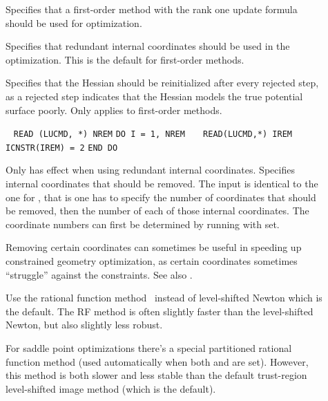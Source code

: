 \begin{description}

\item[]
Specifies that a first-order method
with the rank
one update formula should be used for optimization.

\item[]
Specifies that redundant internal coordinates should be used in the
optimization. This is the default for first-order
methods.

\item[]
Specifies that the Hessian should be reinitialized after every
rejected step, as a rejected step
indicates that the Hessian models the
true potential surface poorly. Only applies to first-order
methods.

\item[]\verb| |\newline
\verb|READ (LUCMD, *) NREM|\newline
\verb|DO I = 1, NREM|\newline
\verb|   READ(LUCMD,*) IREM|\newline
\verb|   ICNSTR(IREM) = 2|\newline
\verb|END DO|

Only has effect when using redundant internal coordinates.
Specifies internal coordinates that should be removed. The input is
identical to the one for , that is one has to specify
the number of coordinates that should be removed, then the number of
each of those internal coordinates. The coordinate numbers can first
be determined by running with  set.

Removing certain coordinates can sometimes be useful in speeding up
constrained geometry optimization, as certain coordinates sometimes
``struggle'' against the constraints. See also .

\item[]
Use the rational function method~\cite{abnajsrsjpc89} instead of
level-shifted Newton which is the default. The RF method is often
slightly faster than the level-shifted Newton, but also slightly less
robust.

For saddle point optimizations there's a special partitioned rational
function method (used automatically when both 
and  are set). However, this method is both slower and
less stable than the default trust-region level-shifted image method
(which is the default).


\end{description}
